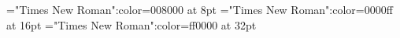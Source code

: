 \font\tctbta="Times New Roman":color=008000 at 8pt
\font\tbta="Times New Roman":color=0000ff at 16pt
\font\ta="Times New Roman":color=ff0000 at 32pt

\bye
